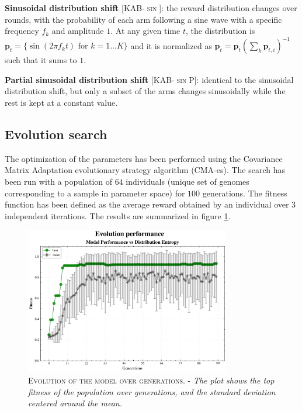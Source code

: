 \noindent \textbf{Sinusoidal distribution shift} [\textsc{KAB-$\sin$}]: the reward distribution changes over rounds, with the probability of each arm following a sine wave with a specific frequency $f_{k}$ and amplitude $1$. At any given time $t$, the distribution is $\mathbf{p}_{t}=\{\sin(2\pi f_{k}
t)\text{  for }k=1\ldots K\}$ and it is
normalized as $\mathbf{p}_{t} = \mathbf{p}_{t}(\sum_{k} \mathbf{p}_{t,i})^{-1}$ such that it sums to $1$.

\noindent \textbf{Partial sinusoidal distribution shift} [\textsc{KAB-$\sin$P}]: identical to the sinusoidal distribution shift, but only a subset of the arms changes sinusoidally while the rest is kept at a constant value.


\subsection{Evolution search}
The optimization of the parameters has been performed using the Covariance Matrix Adaptation evolutionary strategy algorithm (CMA-es).
The search has been run with a population of $64$ individuals (unique set of genomes corresponding to a sample in parameter space) for $100$ generations. The fitness function has been defined as the average reward obtained by an individual over 3 independent iterations.
The results are summarized in figure \ref{fig:evolution}.

\begin{figure}[h]
    \centering
    \includegraphics[width=0.8\textwidth]{figures/evolution_plot.png}
    \caption{\textsc{Evolution of the model over generations.} - \textit{The plot shows the top fitness of the population over generations, and the standard deviation centered around the mean.}}
    \label{fig:evolution}
\end{figure}


